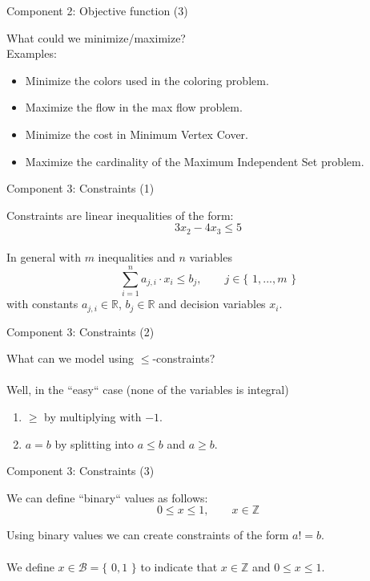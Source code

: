 \documentclass[10pt]{beamer}
\newcommand{\q}[1]{``#1``}
\newcommand{\curlO}{\{\,\,}
\newcommand{\curlC}{\,\,\}}
\begin{document}
\begin{frame}{Component 2: Objective function (3)}

What could we minimize/maximize?\\
Examples:
\begin{itemize}
	\item Minimize the colors used in the coloring problem.
	\item Maximize the flow in the max flow problem.
	\item Minimize the cost in Minimum Vertex Cover.
	\item Maximize the cardinality of the Maximum Independent Set problem.
\end{itemize}

\end{frame}

\begin{frame}{Component 3: Constraints (1)}

Constraints are linear inequalities of the form:
\begin{equation}
	3x_2 - 4x_3 \leq 5
\end{equation}
\,\\
In general with $m$ inequalities and $n$ variables
\begin{equation}
	\sum\limits_{i=1}^{n} a_{j,i}\cdot x_i \leq b_j,\qquad j\in \curlO 1, ..., m \curlC
\end{equation}
with constants $a_{j,i} \in \mathbb{R}$, $b_j\in \mathbb{R}$ and decision variables $x_i$.
\end{frame}

\begin{frame}{Component 3: Constraints (2)}

What can we model using $\leq$-constraints?\\\,\\
Well, in the \q{easy} case (none of the variables is integral)
\begin{enumerate}
	\item $\geq$ by multiplying with $-1$.
	\item $a=b$ by splitting into $a\leq b$ and $a\geq b$.
\end{enumerate}


\end{frame}


\begin{frame}{Component 3: Constraints (3)}

We can define \q{binary} values as follows:\\
\begin{equation}
	0\leq x \leq 1, \qquad x\in \mathbb{Z}
\end{equation}

Using binary values we can create constraints of the form $a != b$.\\\,\\
We define $x \in \mathcal{B} = \curlO 0,1\curlC$ to indicate that $x\in \mathbb{Z}$ and $0\leq x\leq 1$.

\end{frame}
\end{document}
